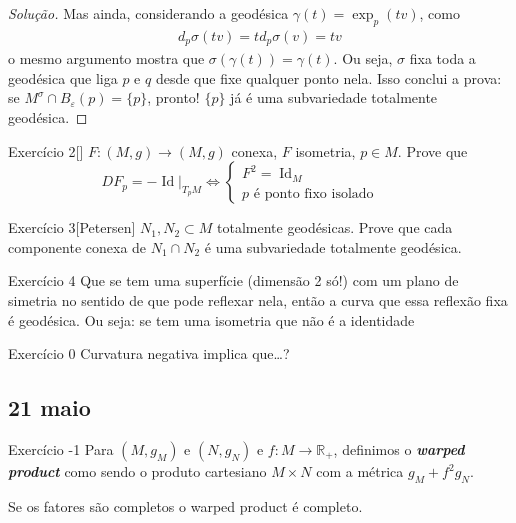 \begin{proof}[Solução]
Mas ainda, considerando a geodésica \(\gamma(t)=\operatorname{exp}_p(tv)\), como
	\begin{align*}d_p\sigma(tv)=td_p\sigma(v)=tv
\end{align*}
o mesmo argumento mostra que \(\sigma(\gamma(t))=\gamma(t)\). Ou seja, \(\sigma\) fixa toda a geodésica que liga \(p\) e \(q\) desde que fixe qualquer ponto nela. Isso conclui a prova: se \(M^\sigma \cap B_\varepsilon(p)=\{p\}\), pronto! \(\{p\}\) já é uma subvariedade totalmente geodésica.
\end{proof}

\begin{thing4}{Exercício 2}[\cite{pet}]\label{exer:}\leavevmode
\(F:(M,g) \to (M,g)\) conexa, \(F\) isometria, \(p \in M\). Prove que
\[DF_p=-\operatorname{Id}|_{T_pM} \iff \begin{cases}
	F^2=\operatorname{Id}_M\qquad & \\
	p\text{ é ponto fixo isolado} \qquad &
\end{cases}\]
\end{thing4}

\begin{thing4}{Exercício 3}[Petersen]\label{exer:3}\leavevmode
\(N_1,N_2 \subset M\) totalmente geodésicas. Prove que cada componente conexa de \(N_1 \cap N_2\) é uma subvariedade totalmente geodésica.
\end{thing4}

\begin{thing4}{Exercício 4}\label{exer:4}\leavevmode
Que se tem uma superfície (dimensão 2 só!) com um plano de simetria no sentido de que pode reflexar nela, então a curva que essa reflexão fixa é geodésica. Ou seja: se tem uma isometria que não é a identidade
\end{thing4}

\begin{thing4}{Exercício 0}\label{exer:0}\leavevmode
Curvatura negativa implica que…?
\end{thing4}


\subsection{21 maio}

\begin{thing6}{Exercício -1}\label{exer:-1}\leavevmode
Para \((M,g_M)\) e \((N,g_N)\) e \(f:M \to \mathbb{R}_+\), definimos o \textit{\textbf{warped product}} como sendo o produto cartesiano \(M\times N\) com a métrica \(g_M+f^2g_N\).

Se os fatores são completos o warped product é completo.
\end{thing6}

